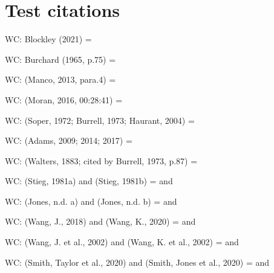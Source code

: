 \section*{Test citations}

WC: Blockley (2021) = \citet{blockley2021evs}


WC: Burchard (1965, p.75) = \citet[75]{burchard1965hhl}


WC: (Manco, 2013, para.4) = \cite[para.4]{manco2013va}


WC: (Moran, 2016, 00:28:41) = \cite[timestamp 00:28:41]{moran2016sol}


WC: (Soper, 1972; Burrell, 1973; Haurant, 2004) = \cite{burrell1973ist, haurant2004bbh, soper1972rbc}


WC: (Adams, 2009; 2014; 2017) = \cite{adams2009tc1, adams2014tc2, adams2017tc3}


WC: (Walters, 1883; cited by Burrell, 1973, p.87) = \cite[Walters, 1883; cited by][87]{burrell1973ist}



WC: (Stieg, 1981a) and (Stieg, 1981b) = \cite{stieg1981cer} and \cite{stieg1981inh}


WC: (Jones, n.d. a) and (Jones, n.d. b) = \cite{jonesNDa} and \cite{jonesNDb}


WC: (Wang, J., 2018) and (Wang, K., 2020) = \cite{wang2018tc} and \cite{wang2020tc}


WC: (Wang, J. et al., 2002) and (Wang, K. et al., 2002) = \cite{wang.etal2002tc6} and \cite{wang.etal2002tc7}


WC: (Smith, Taylor et al., 2020) and (Smith, Jones et al., 2020) = \cite{smith.etal2020tc8} and \cite{smith.etal2020tc9}


